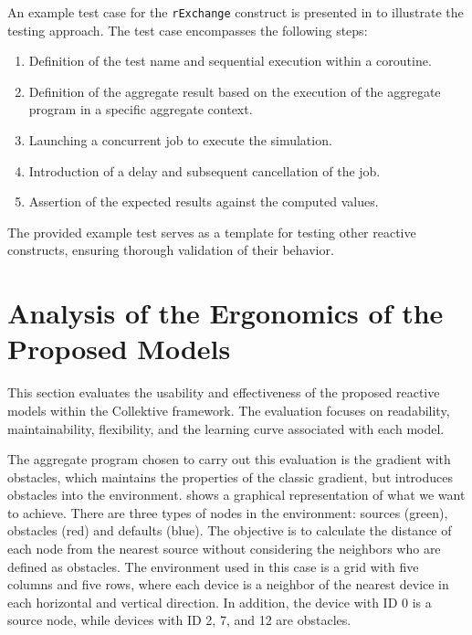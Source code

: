 An example test case for the \texttt{rExchange} construct is presented in  to illustrate the testing approach. The test case encompasses the following steps:

\begin{enumerate}
    \item Definition of the test name and sequential execution within a coroutine.
    \item Definition of the aggregate result based on the execution of the aggregate program in a specific aggregate context.
    \item Launching a concurrent job to execute the simulation.
    \item Introduction of a delay and subsequent cancellation of the job.
    \item Assertion of the expected results against the computed values.
\end{enumerate}

The provided example test serves as a template for testing other reactive constructs, ensuring thorough validation of their behavior.



\section{Analysis of the Ergonomics of the Proposed Models}
\label{section:analysis-ergonomics-proposed-models}

This section evaluates the usability and effectiveness of the proposed reactive models within the Collektive framework. The evaluation focuses on readability, maintainability, flexibility, and the learning curve associated with each model.

The aggregate program chosen to carry out this evaluation is the gradient with obstacles, which maintains the properties of the classic gradient, but introduces obstacles into the environment.  shows a graphical representation of what we want to achieve. There are three types of nodes in the environment: sources (green), obstacles (red) and defaults (blue). The objective is to calculate the distance of each node from the nearest source without considering the neighbors who are defined as obstacles. The environment used in this case is a grid with five columns and five rows, where each device is a neighbor of the nearest device in each horizontal and vertical direction. In addition, the device with ID 0 is a source node, while devices with ID 2, 7, and 12 are obstacles.

